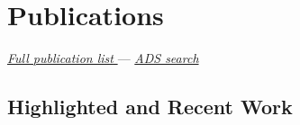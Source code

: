 \documentclass[12pt, letterpaper]{apw-cv}
\begin{document}


\section*{Publications}
\vspace{-1em}

\href{https://adrian.pw/cv/PriceWhelan-pubs.pdf}{{\it Full publication list} \faLink}
--- \href{\adsurl}{{\it ADS search} \faLink}



\subsection*{Highlighted and Recent Work}
    \begin{itemize}
        
    \end{itemize}


%         
\end{document}
